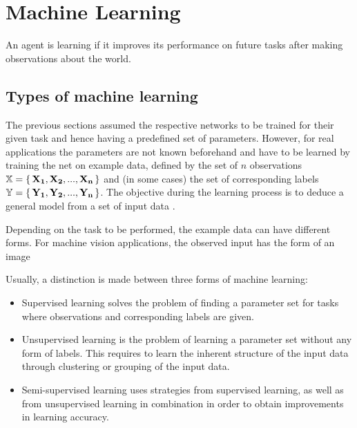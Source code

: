 	
	
		
\section { Machine Learning }
	\begin{displayquote}
		An agent is learning if it improves its performance on future tasks after making observations about the world.
	\end{displayquote}
	
	
	\subsection { Types of machine learning }

		The previous sections assumed the respective networks to be trained for their given task and hence having a predefined set of parameters. However, for real applications the parameters are not known beforehand and have to be learned by training the net on example data, defined by the set of $n$ observations $\mathbb{X} = \set{\mathbf{X_1},\mathbf{ X_2}, ..., \mathbf{X_n}}$ and (in some cases) the set of corresponding labels $\mathbb{Y} = \set{\mathbf{Y_1},\mathbf{Y_2}, ..., \mathbf{Y_n}}$. The objective during the learning process is to deduce a general model from a set of input data \cite{Bishop2009}. 
	
		
		Depending on the task to be performed, the example data can have different forms. For machine vision applications, the observed input has the form of an image
		
		Usually, a distinction is made between three forms of machine learning:
		
		\begin{itemize}
			\item Supervised learning solves the problem of finding a parameter set for tasks where observations and corresponding labels are given. 
			
			\item Unsupervised learning is the problem of learning a parameter set without any form of labels. This requires to learn the inherent structure of the input data through clustering or grouping of the input data.
			
			\item Semi-supervised learning uses strategies from supervised learning, as well as from unsupervised learning in combination in order to obtain improvements in learning accuracy. 
			

		\end{itemize}
	
